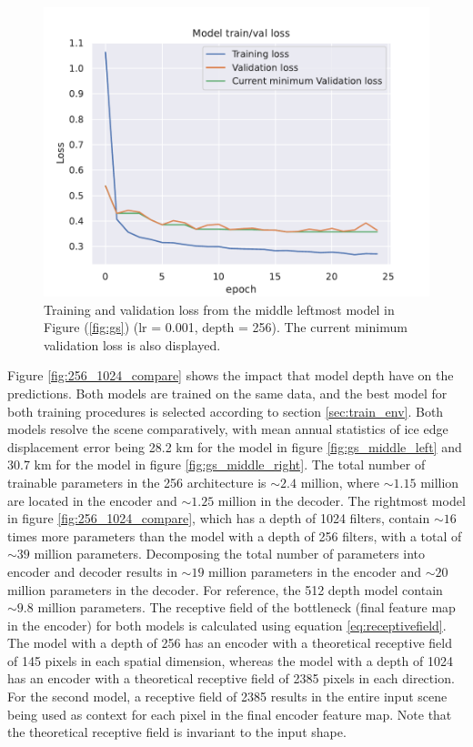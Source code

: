 \documentclass[../main/thesis]{subfiles}
\begin{document}
\begin{figure}
    \centering
    \includegraphics[width=\textwidth]{loss_curve_best_model_gs}
    \caption{\label{fig:loss_curve_from_gs}Training and validation loss from the middle leftmost model in Figure (\ref{fig:gs}) (lr = 0.001, depth = 256). The current minimum validation loss is also displayed.}
\end{figure}

Figure \ref{fig:256_1024_compare} shows the impact that model depth have on the predictions. Both models are trained on the same data, and the best model for both training procedures is selected according to section \ref{sec:train_env}. Both models resolve the scene comparatively, with mean annual statistics of ice edge displacement error being 28.2 km for the model in figure \ref{fig:gs_middle_left} and 30.7 km for the model in figure \ref{fig:gs_middle_right}. The total number of trainable parameters in the 256 architecture is $\sim 2.4$ million, where $\sim 1.15$ million are located in the encoder and $\sim 1.25$ million in the decoder. The rightmost model in figure \ref{fig:256_1024_compare}, which has a depth of 1024 filters, contain $\sim 16$ times more parameters than the model with a depth of 256 filters, with a total of $\sim39 $ million parameters. Decomposing the total number of parameters into encoder and decoder results in $\sim 19$ million parameters in the encoder and $\sim 20$ million parameters in the decoder. For reference, the 512 depth model contain $\sim 9.8$ million parameters. The receptive field of the bottleneck (final feature map in the encoder) for both models is calculated using equation \ref{eq:receptivefield}. The model with a depth of 256 has an encoder with a theoretical receptive field of 145 pixels in each spatial dimension, whereas the model with a depth of 1024 has an encoder with a theoretical receptive field of 2385 pixels in each direction. For the second model, a receptive field of 2385 results in the entire input scene being used as context for each pixel in the final encoder feature map. Note that the theoretical receptive field is invariant to the input shape.
\end{document}
